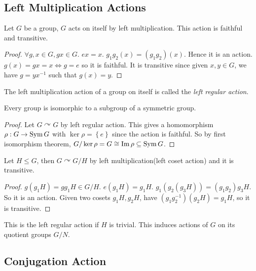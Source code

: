 \documentclass[a4paper]{article}
\begin{document}
      \subsection{Left Multiplication Actions}
      \begin{lemma}\label{lma:5.13}
          Let $G$ be a group, $G$ acts on itself by left multiplication. This action is faithful and transitive.
      \end{lemma}
      \begin{proof}
          $ \forall g,x\in G, gx\in G $. $ ex=x $. $ g_1g_2(x)=(g_1g_2)(x) $. Hence it is an action. $ g(x)=gx=x \Leftrightarrow g=e $ so it is faithful. It is transitive since given $x,y\in G$, we have $g=yx^{-1}$ such that $g(x)=y$.
      \end{proof}
      \begin{definition}
          The left multiplication action of a group on itself is called the \textit{left regular action}.
      \end{definition}
      \begin{theorem}[Cayley]\label{thm:Cayley}
          Every group is isomorphic to a subgroup of a symmetric group.
      \end{theorem}
      \begin{proof}
          Let $ G \curvearrowright G $ by left regular action. This gives a homomorphism $ \rho: G \to \operatorname{Sym} G $ with $ \ker \rho=\left\{ e \right\} $ since the action is faithful. So by first isomorphism theorem, $G/\ker \rho=G \cong \operatorname{Im} \rho \subseteq \operatorname{Sym} G$. 
      \end{proof}
      \begin{proposition}\label{prop:5.16}
          Let $H\le G$, then $G \curvearrowright G/H$ by left multiplication(left coset action) and it is transitive.
      \end{proposition}
      \begin{proof}
          $ g(g_1H)=gg_1H\in G/H $. $ e(g_1H)=g_1H $. $ g_1(g_2(g_3H))=(g_1g_2)g_3H $. So it is an action. Given two cosets $ g_1H,g_2H $, have $ (g_1g_2^{-1})(g_2H)=g_1H $, so it is transitive.
      \end{proof}
      \begin{remark}
          This is the left regular action if $H$ is trivial. This induces actions of $G$ on its quotient groups $G/N$.
      \end{remark}
      \subsection{Conjugation Action}
\end{document}
